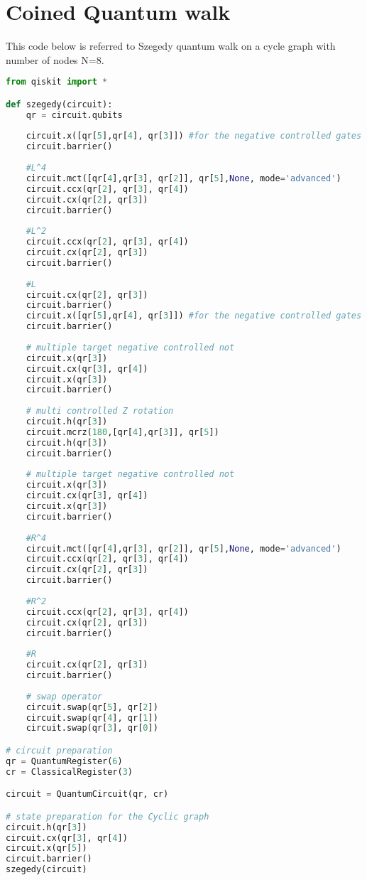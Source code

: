 \section{Coined Quantum walk}
This code below is referred to Szegedy quantum walk on a
cycle graph with number of nodes N=8.

\begin{lstlisting}[breaklines,language=Python,basicstyle=\tiny]
from qiskit import *

def szegedy(circuit):
    qr = circuit.qubits
    
    circuit.x([qr[5],qr[4], qr[3]]) #for the negative controlled gates
    circuit.barrier()
    
    #L^4
    circuit.mct([qr[4],qr[3], qr[2]], qr[5],None, mode='advanced')
    circuit.ccx(qr[2], qr[3], qr[4])
    circuit.cx(qr[2], qr[3])
    circuit.barrier()
    
    #L^2
    circuit.ccx(qr[2], qr[3], qr[4])
    circuit.cx(qr[2], qr[3])
    circuit.barrier()
    
    #L
    circuit.cx(qr[2], qr[3])
    circuit.barrier()
    circuit.x([qr[5],qr[4], qr[3]]) #for the negative controlled gates
    circuit.barrier()
    
    # multiple target negative controlled not
    circuit.x(qr[3])
    circuit.cx(qr[3], qr[4])
    circuit.x(qr[3])
    circuit.barrier()
    
    # multi controlled Z rotation
    circuit.h(qr[3])
    circuit.mcrz(180,[qr[4],qr[3]], qr[5])
    circuit.h(qr[3])
    circuit.barrier()
    
    # multiple target negative controlled not
    circuit.x(qr[3])
    circuit.cx(qr[3], qr[4])
    circuit.x(qr[3])
    circuit.barrier()
    
    #R^4
    circuit.mct([qr[4],qr[3], qr[2]], qr[5],None, mode='advanced')
    circuit.ccx(qr[2], qr[3], qr[4])
    circuit.cx(qr[2], qr[3])
    circuit.barrier()
    
    #R^2
    circuit.ccx(qr[2], qr[3], qr[4])
    circuit.cx(qr[2], qr[3])
    circuit.barrier()
    
    #R
    circuit.cx(qr[2], qr[3])
    circuit.barrier()
    
    # swap operator
    circuit.swap(qr[5], qr[2])
    circuit.swap(qr[4], qr[1])
    circuit.swap(qr[3], qr[0])

# circuit preparation
qr = QuantumRegister(6)
cr = ClassicalRegister(3)

circuit = QuantumCircuit(qr, cr)

# state preparation for the Cyclic graph
circuit.h(qr[3])
circuit.cx(qr[3], qr[4])
circuit.x(qr[5])
circuit.barrier()
szegedy(circuit)
\end{lstlisting}
